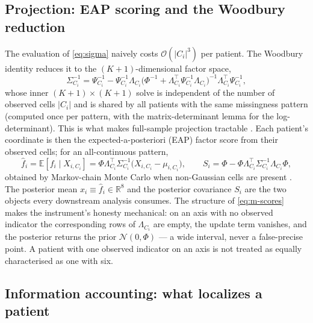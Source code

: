 \subsection{Projection: EAP scoring and the Woodbury reduction}
\label{sec:m-project}

The evaluation of \eqref{eq:sigma} naively costs $\mathcal{O}(|C_i|^3)$ per
patient. The Woodbury identity reduces it to the $(K{+}1)$-dimensional factor
space,
\begin{equation}
  \Sigma_{C_i}^{-1}=\Psi_{C_i}^{-1}-\Psi_{C_i}^{-1}\Lambda_{C_i}
  \big(\Phi^{-1}+\Lambda_{C_i}^{\top}\Psi_{C_i}^{-1}\Lambda_{C_i}\big)^{-1}
  \Lambda_{C_i}^{\top}\Psi_{C_i}^{-1},
  \label{eq:m-woodbury}
\end{equation}
whose inner $(K{+}1)\times(K{+}1)$ solve is independent of the number of observed
cells $|C_i|$ and is shared by all patients with the same missingness pattern
(computed once per pattern, with the matrix-determinant lemma for the
log-determinant). This is what makes full-sample projection tractable
\citep{harville1997matrix}. Each patient's coordinate is then the
expected-a-posteriori (EAP) factor score from their observed cells; for an
all-continuous pattern,
\begin{equation}
  \hat f_i=\mathbb E[f_i\mid X_{i,C_i}]
  =\Phi\Lambda_{C_i}^{\top}\Sigma_{C_i}^{-1}\!\big(X_{i,C_i}-\mu_{i,C_i}\big),\qquad
  S_i=\Phi-\Phi\Lambda_{C_i}^{\top}\Sigma_{C_i}^{-1}\Lambda_{C_i}\Phi ,
  \label{eq:m-scores}
\end{equation}
obtained by Markov-chain Monte Carlo when non-Gaussian cells are present
\citep{bockaitkin1981}. The posterior mean $x_i\equiv\hat f_i\in\mathbb R^{8}$ and
the posterior covariance $S_i$ are the two objects every downstream analysis
consumes. The structure of \eqref{eq:m-scores} makes the instrument's honesty
mechanical: on an axis with no observed indicator the corresponding rows of
$\Lambda_{C_i}$ are empty, the update term vanishes, and the posterior returns the
prior $\mathcal N(0,\Phi)$ --- a wide interval, never a false-precise point. A
patient with one observed indicator on an axis is not treated as equally
characterised as one with six.

\subsection{Information accounting: what localizes a patient}
\label{sec:m-info}

